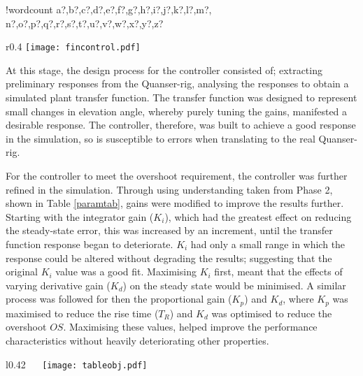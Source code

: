 \documentclass[11pt]{article}
\newcounter{words}
\newenvironment{counted}{%
  \setcounter{words}{0}
  \SearchList!{wordcount}{\stepcounter{words}}
    {a?,b?,c?,d?,e?,f?,g?,h?,i?,j?,k?,l?,m?,
    n?,o?,p?,q?,r?,s?,t?,u?,v?,w?,x?,y?,z?}
  \UndoBoundary{'}
  \SearchOrder{p;}}{%
  \StopSearching}
\begin{document}
\begin{counted}
\begin{wrapfigure}{r}{0.4\textwidth}
 \vspace{-25pt}
 \centering
  \texttt{[image: fincontrol.pdf]}
\vspace{-10pt}
  \caption{Showing Improved Controller Architecture}
  \vspace{-20pt}
  \label{fincontrol}
 \end{wrapfigure}

At this stage, the design process for the controller consisted of;
extracting preliminary responses from the Quanser-rig, analysing the
responses to obtain a simulated plant transfer function. The transfer
function was designed to represent small changes in elevation angle,
whereby purely tuning the gains, manifested a desirable response. The
controller, therefore, was built to achieve a good response in the
simulation, so is susceptible to errors when translating to the real
Quanser-rig.

For the controller to meet the overshoot requirement, the controller was
further refined in the simulation. Through using understanding taken
from Phase 2, shown in Table \ref{paramtab}, gains were modified to
improve the results further. Starting with the integrator gain
(\(K_i\)), which had the greatest effect on reducing the steady-state
error, this was increased by an increment, until the transfer function
response began to deteriorate. \(K_i\) had only a small range in which
the response could be altered without degrading the results; suggesting
that the original \(K_i\) value was a good fit. Maximising \(K_i\)
first, meant that the effects of varying derivative gain (\(K_d\)) on
the steady state would be minimised. A similar process was followed for
then the proportional gain (\(K_p\)) and \(K_d\), where \(K_p\) was
maximised to reduce the rise time (\(T_R\)) and \(K_d\) was optimised to
reduce the overshoot \(OS\). Maximising these values, helped improve the
performance characteristics without heavily deteriorating other
properties.

\begin{wrapfigure}{l}{0.42\textwidth}
 \vspace{-25pt}
\centering
{}
\vspace{-5pt}
 \texttt{[image: tableobj.pdf]}
 \vspace{-25pt}
 \label{paramtab}
 \end{wrapfigure}


\end{counted}
\end{document}
